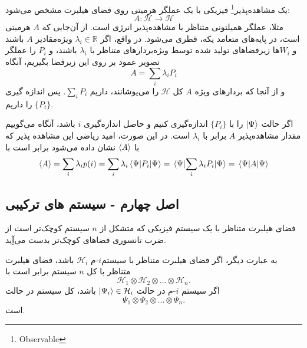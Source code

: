 \begin{example}
یک مشاهده‌پذیر\footnote{Observable} فیزیکی با یک عملگر هرمیتی روی فضای هیلبرت مشخص می‌شود: 
\begin{equation}
A: \mathcal{H} \to \mathcal{H}
\end{equation}
مثلا، عملگر همیلتونی متناظر با مشاهده‌پذیر انرژی است. از آن‌جایی که $A$ هرمیتی است، در پایه‌های متعامد یکه، قطری می‌شود. در واقع، اگر $\lambda_{i} \in \mathbb{R}$ ویژه‌مقادیر $A$ باشند و $W_{i}$‌ها زیرفضاهای تولید شده توسط ویژه‌بردارهای متناظر با $\lambda_{i}$ باشند، و $P_{i}$ را عملگر تصویر عمود بر روی این زیرفضا بگیریم، آنگاه 
\begin{equation}
	A = \sum_{i}\lambda_{i}P_{i}
\end{equation}
و از آنجا که بردارهای ویژه $A$ کل $\mathcal{H}$ را می‌پوشانند، داریم $\sum_{i} P_{i}$. پس اندازه گیری $\{P_{i}\}$ را داریم. 

اگر حالت $\ket{\Psi}$ را با $\{P_{i}\}$ اندازه‌گیری کنیم و حاصل اندازه‌گیری $i$ باشد، آنگاه می‌گوییم مقدار مشاهده‌پذیر $A$ برابر با $\lambda_{i}$  است. در این صورت، امید ریاضی این مشاهده پذیر که با $\expval{A}$ نشان داده می‌شود برابر است با
\begin{equation}
	\expval{A} = \sum_{i} \lambda_{i} p(i)  = \sum_{i} \lambda_{i} \mel{\Psi}{P_{i}}{\Psi} = \mel{\Psi}{\sum_{i} \lambda_{i} P_{i}}{\Psi} = \mel{\Psi}{A}{\Psi}
\end{equation}
\end{example}

\subsection{اصل چهارم - سیستم های ترکیبی}
فضای هیلبرت متناظر با یک سیستم فیزیکی که متشکل از $n$ سیستم کوچک‌تر است از ضرب تانسوری فضاهای کوچک‌تر بدست می‌آِید. 

به عبارت دیگر، اگر فضای هیلبرت متناظر با سیستم$i$-م $\mathcal{H}_{i}$ باشد، فضای هیلبرت متناظر با کل $n$ سیستم برابر است با 
\begin{equation}
	\mathcal{H}_{1} \otimes \mathcal{H}_{2} \otimes ... \otimes \mathcal{H}_{n}.
\end{equation} 
اگر سیستم $i$-م در حالت $\ket{\Psi_{i}} \in \mathcal{H}_{i}$ باشد، کل سیستم در حالت 
\begin{equation}
	\Psi_{1} \otimes \Psi_{2} \otimes ... \otimes \Psi_{n}.
\end{equation}
است. 

